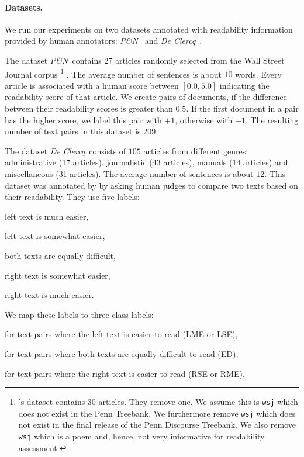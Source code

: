 \paragraph{Datasets.} We run our experiments on two datasets annotated
with readability information provided by human annotators: \emph{P\&N}\
\cite{pitler08} and \emph{De Clercq}\ \cite{declercq14}.

The dataset \emph{P\&N}\ contains 27 articles randomly selected from
the Wall Street Journal corpus%
%
\footnote{'s dataset contains 30 articles. They
  remove one. We assume this is \texttt{wsj\--0382} which
does not exist in the Penn Treebank. We furthermore remove
\texttt{wsj} which does not exist in the final release of the
Penn Discourse Treebank. We also remove \texttt{wsj\--1398} which is a
poem and, hence, not very informative for readability assessment.}%
%
. The average number of sentences is about $10$ words. Every article is
associated with a human score between $[0.0,5.0]$ indicating the
readability score of that article. We create pairs of documents, if
the difference between their readability scores is greater than
$0.5$. If the first document in a pair has the higher score, we label
this pair with $+1$, otherwise with $-1$. The resulting number of text pairs in
this dataset is $209$.

The dataset \emph{De Clercq}\ consists of $105$ articles from different
genres: administrative (17 articles), journalistic (43 articles), manuals (14 articles) and miscellaneous (31 articles). The
average number of sentences is about $12$. This dataset was annotated
by \newcite{declercq14} by asking human judges to compare two texts
based on their readability. They use five labels:
\squishlist
\item[\textbf{LME:}] left text is much easier,
\item[\textbf{LSE:}] left text is somewhat easier, 
\item[\textbf{ED:}] both texts are equally difficult,
\item[\textbf{RSE:}] right text is somewhat easier,
\item[\textbf{RME:}] right text is much easier.
\squishend

We map these labels to three class labels:

\squishlist
\item[\textbf{$+1$:}] for text pairs where the left text is easier to read
  (LME or LSE),
\item[\textbf{$0$:}] for text pairs where both texts are equally
  difficult to read (ED), 
\item[\textbf{$-1$:}] for text pairs where the right text is easier to read (RSE or RME).
\squishend

